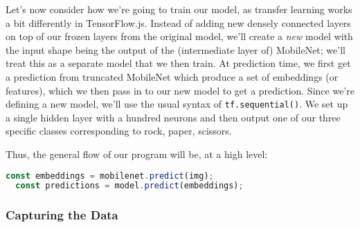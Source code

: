 \documentclass[12pt]{article}
\begin{document}
Let's now consider how we're going to train our model, as transfer learning works a bit differently in TensorFlow.js. Instead of adding new densely connected layers on top of our frozen layers from the original model, we'll create a \emph{new} model with the input shape being the output of the (intermediate layer of) MobileNet; we'll treat this as a separate model that we then train. At prediction time, we first get a prediction from truncated MobileNet which produce a set of embeddings (or features), which we then pass in to our new model to get a prediction. Since we're defining a new model, we'll use the usual syntax of \texttt{tf.sequential()}. We set up a single hidden layer with a hundred neurons and then output one of our three specific classes corresponding to rock, paper, scissors.

Thus, the general flow of our program will be, at a high level:
\begin{lstlisting}[language=JavaScript]
  const embeddings = mobilenet.predict(img);
  const predictions = model.predict(embeddings);
\end{lstlisting}

\subsubsection{Capturing the Data}
\end{document}
